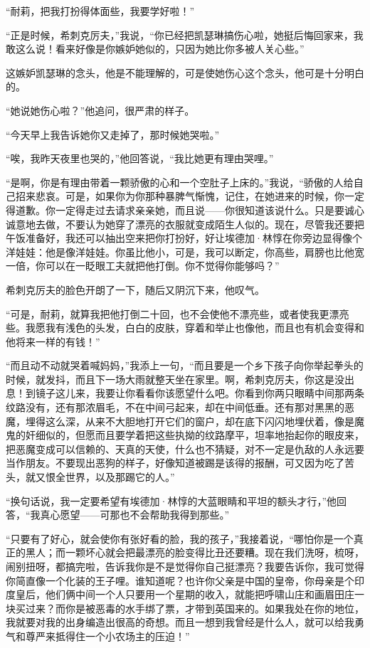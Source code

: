 \par “耐莉，把我打扮得体面些，我要学好啦！”
\par “正是时候，希刺克厉夫，”我说，“你已经把凯瑟琳搞伤心啦，她挺后悔回家来，我敢这么说！看来好像是你嫉妒她似的，只因为她比你多被人关心些。”
\par 这嫉妒凯瑟琳的念头，他是不能理解的，可是使她伤心这个念头，他可是十分明白的。
\par “她说她伤心啦？”他追问，很严肃的样子。
\par “今天早上我告诉她你又走掉了，那时候她哭啦。”
\par “唉，我昨天夜里也哭的，”他回答说，“我比她更有理由哭哩。”
\par “是啊，你是有理由带着一颗骄傲的心和一个空肚子上床的。”我说，“骄傲的人给自己招来悲哀。可是，如果你为你那种暴脾气惭愧，记住，在她进来的时候，你一定得道歉。你一定得走过去请求亲亲她，而且说——你很知道该说什么。只是要诚心诚意地去做，不要认为她穿了漂亮的衣服就变成陌生人似的。现在，尽管我还要把午饭准备好，我还可以抽出空来把你打扮好，好让埃德加·林惇在你旁边显得像个洋娃娃：他是像洋娃娃。你虽比他小，可是，我可以断定，你高些，肩膀也比他宽一倍，你可以在一眨眼工夫就把他打倒。你不觉得你能够吗？”
\par 希刺克厉夫的脸色开朗了一下，随后又阴沉下来，他叹气。
\par “可是，耐莉，就算我把他打倒二十回，也不会使他不漂亮些，或者使我更漂亮些。我愿我有浅色的头发，白白的皮肤，穿着和举止也像他，而且也有机会变得和他将来一样的有钱！”
\par “而且动不动就哭着喊妈妈，”我添上一句，“而且要是一个乡下孩子向你举起拳头的时候，就发抖，而且下一场大雨就整天坐在家里。啊，希刺克厉夫，你这是没出息！到镜子这儿来，我要让你看看你该愿望什么吧。你看到你两只眼睛中间那两条纹路没有，还有那浓眉毛，不在中间弓起来，却在中间低垂。还有那对黑黑的恶魔，埋得这么深，从来不大胆地打开它们的窗户，却在底下闪闪地埋伏着，像是魔鬼的奸细似的，但愿而且要学着把这些执拗的纹路摩平，坦率地抬起你的眼皮来，把恶魔变成可以信赖的、天真的天使，什么也不猜疑，对不一定是仇敌的人永远要当作朋友。不要现出恶狗的样子，好像知道被踢是该得的报酬，可又因为吃了苦头，就又恨全世界，以及那踢它的人。”
\par “换句话说，我一定要希望有埃德加·林惇的大蓝眼睛和平坦的额头才行，”他回答，“我真心愿望——可那也不会帮助我得到那些。”
\par “只要有了好心，就会使你有张好看的脸，我的孩子，”我接着说，“哪怕你是一个真正的黑人；而一颗坏心就会把最漂亮的脸变得比丑还要糟。现在我们洗呀，梳呀，闹别扭呀，都搞完啦，告诉我你是不是觉得你自己挺漂亮？我要告诉你，我可觉得你简直像一个化装的王子哩。谁知道呢？也许你父亲是中国的皇帝，你母亲是个印度皇后，他们俩中间一个人只要用一个星期的收入，就能把呼啸山庄和画眉田庄一块买过来？而你是被恶毒的水手绑了票，才带到英国来的。如果我处在你的地位，我就要对我的出身编造出很高的奇想。而且一想到我曾经是什么人，就可以给我勇气和尊严来抵得住一个小农场主的压迫！”
